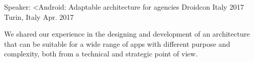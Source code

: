 


\begin{cventries}


\cventry
{Speaker: <Android: Adaptable architecture for agencies} %
{Droidcon Italy 2017} %
{Turin, Italy} %
{Apr. 2017} %
{ %
	\begin{cvitems}
		\item {We shared our experience in the designing and development of an architecture that can be suitable for a wide range of apps with different purpose and complexity, both from a technical and strategic point of view.}
	\end{cvitems}
}


\end{cventries}